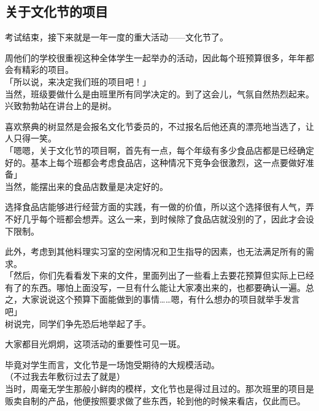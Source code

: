 \subsection{关于文化节的项目}

考试结束，接下来就是一年一度的重大活动——文化节了。

周他们的学校很重视这种全体学生一起举办的活动，因此每个班预算很多，年年都会有精彩的项目。\\

「所以说，来决定我们班的项目吧！」\\

当然，班级要做什么是由班里所有同学决定的。到了这会儿，气氛自然热烈起来。\\

兴致勃勃站在讲台上的是树。

喜欢祭典的树显然是会报名文化节委员的，不过报名后他还真的漂亮地当选了，让人只得一笑。\\

「嗯嗯，关于文化节的项目啊，首先有一点，每个年级有多少食品店都是已经确定好的。基本上每个班都会考虑食品店，这种情况下竞争会很激烈，这一点要做好准备」\\

当然，能摆出来的食品店数量是决定好的。

选择食品店能够进行经营方面的实践，有一做的价值，所以这个选择很有人气，弄不好几乎每个班都会想弄。这么一来，到时候除了食品店就没别的了，因此才会设下限制。

此外，考虑到其他料理实习室的空闲情况和卫生指导的因素，也无法满足所有的需求。\\

「然后，你们先看看发下来的文件，里面列出了一些看上去要花预算但实际上已经有了的东西。哪怕上面没写，一旦有什么能让大家凑出来的，也都要确认一遍。总之，大家说说这个预算下面能做到的事情……嗯，有什么想办的项目就举手发言吧」\\

树说完，同学们争先恐后地举起了手。

大家都目光炯炯，这项活动的重要性可见一斑。

毕竟对学生而言，文化节是一场饱受期待的大规模活动。\\

（不过我去年敷衍过去了就是）\\

当时，周毫无学生那般小鲜肉的模样，文化节也是得过且过的。那次班里的项目是贩卖自制的产品，他便按照要求做了些东西，轮到他的时候来看店，仅此而已。\\

